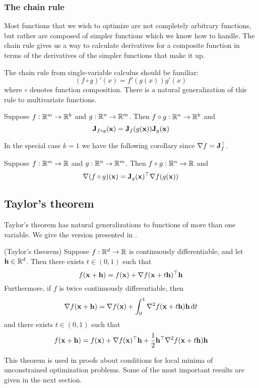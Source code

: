 \subsubsection{The chain rule}
Most functions that we wish to optimize are not completely arbitrary functions, but rather are composed of simpler functions which we know how to handle.
The chain rule gives us a way to calculate derivatives for a composite function in terms of the derivatives of the simpler functions that make it up.

The chain rule from single-variable calculus should be familiar:
\[(f \circ g)'(x) = f'(g(x))g'(x)\]
where $\circ$ denotes function composition.
There is a natural generalization of this rule to multivariate functions.
\begin{proposition}
Suppose $f : \mathbb{R}^m \to \mathbb{R}^k$ and $g : \mathbb{R}^n \to \mathbb{R}^m$. Then $f \circ g : \mathbb{R}^n \to \mathbb{R}^k$ and
\[\mathbf{J}_{f \circ g}(\mathbf{x}) = \mathbf{J}_f(g(\mathbf{x}))\mathbf{J}_g(\mathbf{x})\]
\end{proposition}
In the special case $k = 1$ we have the following corollary since $\nabla f = \mathbf{J}_f^\top$.
\begin{corollary}
Suppose $f : \mathbb{R}^m \to \mathbb{R}$ and $g : \mathbb{R}^n \to \mathbb{R}^m$. Then $f \circ g : \mathbb{R}^n \to \mathbb{R}$ and
\[\nabla (f \circ g)(\mathbf{x}) = \mathbf{J}_g(\mathbf{x})^\top \nabla f(g(\mathbf{x}))\]
\end{corollary}

\subsection{Taylor's theorem}
Taylor's theorem has natural generalizations to functions of more than one variable.
We give the version presented in \cite{numopt}.
\begin{theorem}
(Taylor's theorem)
Suppose $f : \mathbb{R}^d \to \mathbb{R}$ is continuously differentiable, and let $\mathbf{h} \in \mathbb{R}^d$.
Then there exists $t \in (0,1)$ such that
\[f(\mathbf{x} + \mathbf{h}) = f(\mathbf{x}) + \nabla f(\mathbf{x} + t\mathbf{h})^\top\mathbf{h}\]
Furthermore, if $f$ is twice continuously differentiable, then
\[\nabla f(\x + \h) = \nabla f(\x) + \int_0^1 \nabla^2 f(\x + t\h)\h \dif{t}\]
and there exists $t \in (0,1)$ such that
\[f(\mathbf{x} + \mathbf{h}) = f(\mathbf{x}) + \nabla f(\mathbf{x})^\top\mathbf{h} + \frac{1}{2}\mathbf{h}^\top\nabla^2f(\mathbf{x}+t\mathbf{h})\mathbf{h}\]
\end{theorem}
This theorem is used in proofs about conditions for local minima of unconstrained optimization problems.
Some of the most important results are given in the next section.

